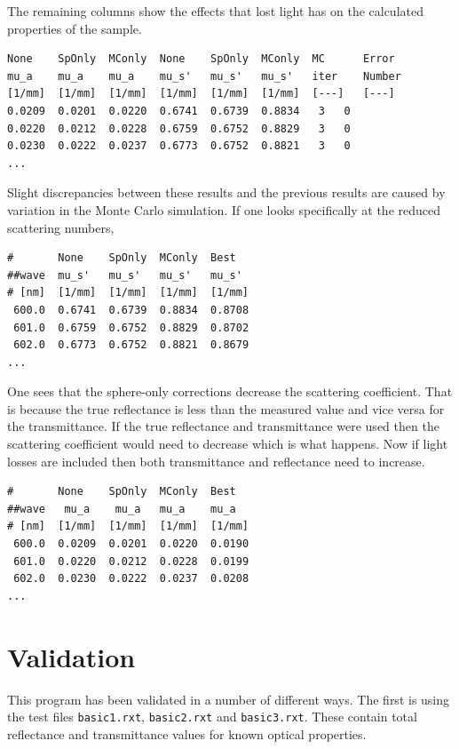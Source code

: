 \documentclass{article}
\begin{document}
The remaining columns show the effects that lost light has on the calculated
properties of the sample.
\begin{verbatim}
None    SpOnly  MConly  None    SpOnly  MConly  MC      Error
mu_a    mu_a    mu_a    mu_s'   mu_s'   mu_s'   iter    Number
[1/mm]  [1/mm]  [1/mm]  [1/mm]  [1/mm]  [1/mm]  [---]   [---]
0.0209  0.0201  0.0220  0.6741  0.6739  0.8834   3   0
0.0220  0.0212  0.0228  0.6759  0.6752  0.8829   3   0
0.0230  0.0222  0.0237  0.6773  0.6752  0.8821   3   0
...
\end{verbatim}

\noindent Slight discrepancies between these results and the previous results are caused by 
variation in the Monte Carlo simulation.  If one looks specifically at the reduced scattering
numbers,
\begin{verbatim}
#       None    SpOnly  MConly  Best    
##wave  mu_s'   mu_s'   mu_s'   mu_s'
# [nm]  [1/mm]  [1/mm]  [1/mm]  [1/mm]
 600.0  0.6741  0.6739  0.8834  0.8708
 601.0  0.6759  0.6752  0.8829  0.8702
 602.0  0.6773  0.6752  0.8821  0.8679
...
\end{verbatim}
One sees that the sphere-only corrections decrease the scattering coefficient.  That is 
because the true reflectance is less than the measured value and vice versa for the 
transmittance.  If the true reflectance and transmittance were used then the scattering
coefficient would need to decrease which is what happens.  Now if light losses are included
then both transmittance and reflectance need to increase.  

\begin{verbatim}
#       None    SpOnly  MConly  Best
##wave   mu_a    mu_a   mu_a    mu_a
# [nm]  [1/mm]  [1/mm]  [1/mm]  [1/mm]
 600.0  0.0209  0.0201  0.0220  0.0190
 601.0  0.0220  0.0212  0.0228  0.0199
 602.0  0.0230  0.0222  0.0237  0.0208
...
\end{verbatim}

\clearpage

\section{Validation}

This program has been validated in a number of different ways.  The first is using the
test files \texttt{basic1.rxt}, \texttt{basic2.rxt} and \texttt{basic3.rxt}.
These contain total reflectance and transmittance values for known optical properties.
\end{document}
